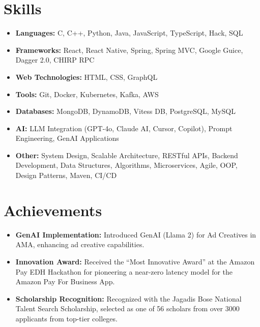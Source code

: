 \documentclass[a4paper,10pt]{article}
\newlength{\leftcolwidth}
\begin{document}
\noindent\begin{minipage}[t]{\leftcolwidth}

\section*{Skills}
\begin{itemize}[leftmargin=*,itemsep=0.3em]
    \small
    \item \textbf{Languages:} C, C++, Python, Java, JavaScript, TypeScript, Hack, SQL
    \item \textbf{Frameworks:} React, React Native, Spring, Spring MVC, Google Guice, Dagger 2.0, CHIRP RPC
    \item \textbf{Web Technologies:} HTML, CSS, GraphQL
    \item \textbf{Tools:} Git, Docker, Kubernetes, Kafka, AWS
    \item \textbf{Databases:} MongoDB, DynamoDB, Vitess DB, PostgreSQL, MySQL
    \item \textbf{AI:} LLM Integration (GPT-4o, Claude AI, Cursor, Copilot), Prompt Engineering, GenAI Applications
    \item \textbf{Other:} System Design, Scalable Architecture, RESTful APIs, Backend Development, Data Structures, Algorithms, Microservices, Agile, OOP, Design Patterns, Maven, CI/CD
\end{itemize}

\section*{Achievements}
\begin{itemize}[leftmargin=*,itemsep=0.3em]
    \small
    \item \textbf{GenAI Implementation:} Introduced GenAI (Llama 2) for Ad Creatives in AMA, enhancing ad creative capabilities.
    \item \textbf{Innovation Award:} Received the ``Most Innovative Award'' at the Amazon Pay EDH Hackathon for pioneering a near-zero latency model for the Amazon Pay For Business App.
    \item \textbf{Scholarship Recognition:} Recognized with the Jagadis Bose National Talent Search Scholarship, selected as one of 56 scholars from over 3000 applicants from top-tier colleges.
\end{itemize}


\end{minipage}
\end{document}
